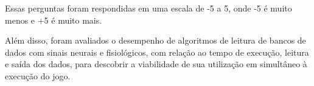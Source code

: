 Essas perguntas foram respondidas em uma escala de -5 a 5, onde -5 é muito menos e +5 é muito mais.

Além disso, foram avaliados o desempenho de algoritmos de leitura de bancos de dados com sinais neurais e fisiológicos, com relação ao tempo de execução, leitura e saída dos dados, para descobrir a viabilidade de sua utilização em simultâneo à execução do jogo. 

